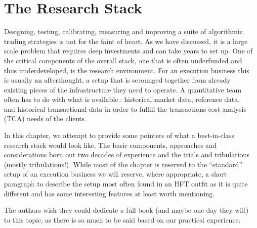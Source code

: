\chapter{The Research Stack\label{chap:ch_tech_res}}\label{in:research_stack1}

Designing, testing, calibrating, measuring and improving a suite of algorithmic trading strategies is not for the faint of heart. As we have discussed, it is a large scale problem that requires deep investments and can take years to set up. One of the critical components of the overall stack, one that is often underfunded and thus underdeveloped, is the research environment. For an execution business this is usually an afterthought, a setup that is scrounged together from already existing pieces of the infrastructure they need to operate. A quantitative team often has to do with what is available.: historical market data, reference data, and historical transactional data in order to fulfill the transactions cost analysis (TCA) needs of the clients.




In this chapter, we attempt to provide some pointers of what a best-in-class research stack would look like. The basic components, approaches and considerations born out two decades of experience and the trials and tribulations (mostly tribulations!). While most of the chapter is reserved to the ``standard'' setup of an execution business we will reserve, where appropriate, a short paragraph to describe the setup most often found in an HFT outfit as it is quite different and has some interesting features at least worth mentioning.


The authors wish they could dedicate a full book (and maybe one day they will) to this topic, as there is so much to be said based on our practical experience. 




